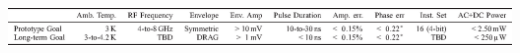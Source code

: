 \documentclass[journal]{IEEEtran}
\newcommand{\CR}[1]{{\color{black}#1}}
\begin{document}
\begin{table}
\begin{center}
\caption{Key specifications for cryogenic XY controller}\label{perfspecs}
\includegraphics[width=2.1\columnwidth]{Figures/table_1}

\end{center}
\end{table}
\end{document}
